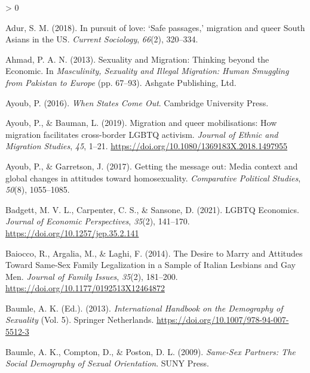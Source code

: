 \documentclass[
  12pt,
]{article}
\newlength{\cslhangindent}
\newenvironment{CSLReferences}[2] %
 {%
  \setlength{\parindent}{0pt}
  \ifodd #1 \everypar{\setlength{\hangindent}{\cslhangindent}}\ignorespaces\fi
  \ifnum #2 > 0
  \setlength{\parskip}{#2\baselineskip}
  \fi
 }%
 {}
\begin{document}
\noindent

\hypertarget{refs}{}
\begin{CSLReferences}{1}{0}
\leavevmode\hypertarget{ref-adur_2018}{}%
Adur, S. M. (2018). In pursuit of love: {`{Safe} passages,'} migration and queer {South Asians} in the {US}. \emph{Current Sociology}, \emph{66}(2), 320--334.

\leavevmode\hypertarget{ref-ahmad_2013}{}%
Ahmad, P. A. N. (2013). Sexuality and {Migration}: Thinking beyond the {Economic}. In \emph{Masculinity, {Sexuality} and {Illegal Migration}: Human {Smuggling} from {Pakistan} to {Europe}} (pp. 67--93). {Ashgate Publishing, Ltd.}

\leavevmode\hypertarget{ref-ayoub_2016}{}%
Ayoub, P. (2016). \emph{When {States Come Out}}. {Cambridge University Press}.

\leavevmode\hypertarget{ref-ayoub_2019_migration}{}%
Ayoub, P., \& Bauman, L. (2019). Migration and queer mobilisations: How migration facilitates cross-border {LGBTQ} activism. \emph{Journal of Ethnic and Migration Studies}, \emph{45}, 1--21. \url{https://doi.org/10.1080/1369183X.2018.1497955}

\leavevmode\hypertarget{ref-ayoub_2017}{}%
Ayoub, P., \& Garretson, J. (2017). Getting the message out: Media context and global changes in attitudes toward homosexuality. \emph{Comparative Political Studies}, \emph{50}(8), 1055--1085.

\leavevmode\hypertarget{ref-badgett_2021_lgbtq}{}%
Badgett, M. V. L., Carpenter, C. S., \& Sansone, D. (2021). {LGBTQ Economics}. \emph{Journal of Economic Perspectives}, \emph{35}(2), 141--170. \url{https://doi.org/10.1257/jep.35.2.141}

\leavevmode\hypertarget{ref-baiocco_2014_desire}{}%
Baiocco, R., Argalia, M., \& Laghi, F. (2014). The {Desire} to {Marry} and {Attitudes Toward Same}-{Sex Family Legalization} in a {Sample} of {Italian Lesbians} and {Gay Men}. \emph{Journal of Family Issues}, \emph{35}(2), 181--200. \url{https://doi.org/10.1177/0192513X12464872}

\leavevmode\hypertarget{ref-baumle_2013}{}%
Baumle, A. K. (Ed.). (2013). \emph{International {Handbook} on the {Demography} of {Sexuality}} (Vol. 5). {Springer Netherlands}. \url{https://doi.org/10.1007/978-94-007-5512-3}

\leavevmode\hypertarget{ref-baumle_2009}{}%
Baumle, A. K., Compton, D., \& Poston, D. L. (2009). \emph{Same-{Sex Partners}: The {Social Demography} of {Sexual Orientation}}. {SUNY Press}.


\end{CSLReferences}
\end{document}
